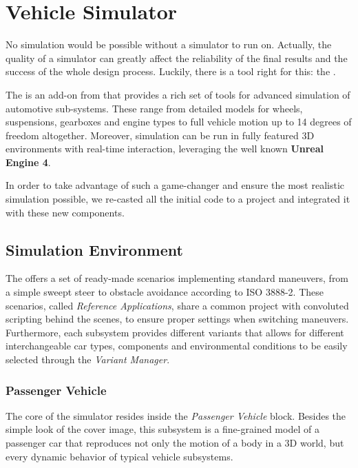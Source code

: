 
\chapter{Vehicle Simulator}

No simulation would be possible without a simulator to run on.
Actually, the quality of a simulator can greatly affect the reliability of the final results and the success of the whole design process.
Luckily, there is a tool right for this: the \textbf{\mwVDB\texttrademark}.

The \mwVDB{} is an add-on from \mwMW{} that provides a rich set of tools for advanced simulation of automotive sub-systems.
These range from detailed models for wheels, suspensions, gearboxes and engine types to full vehicle motion up to 14 degrees of freedom altogether.
Moreover, simulation can be run in fully featured 3D environments with real-time interaction, leveraging the well known \textbf{Unreal Engine 4}.

In order to take advantage of such a game-changer and ensure the most realistic simulation possible,
we re-casted all the initial code to a \mwSL{} project and integrated it with these new components.


	\section{Simulation Environment}

	The \mwVDB{} offers a set of ready-made scenarios implementing standard maneuvers, from a simple sweept steer to obstacle avoidance according to ISO 3888-2.
	These scenarios, called \emph{Reference Applications}, share a common \mwSL{} project with convoluted scripting behind the scenes, to ensure proper settings
	when switching maneuvers. Furthermore, each subsystem provides different variants that allows for different interchangeable car types, components and environmental
	conditions to be easily selected through the \emph{Variant Manager}.


		\subsection{Passenger Vehicle}
		\label{ssec:vs-env-passveh}

		The core of the simulator resides inside the \emph{Passenger Vehicle} block.
		Besides the simple look of the cover image, this subsystem is a fine-grained model of a passenger car that reproduces not only the motion of a body in a 3D world,
		but every dynamic behavior of typical vehicle subsystems.


